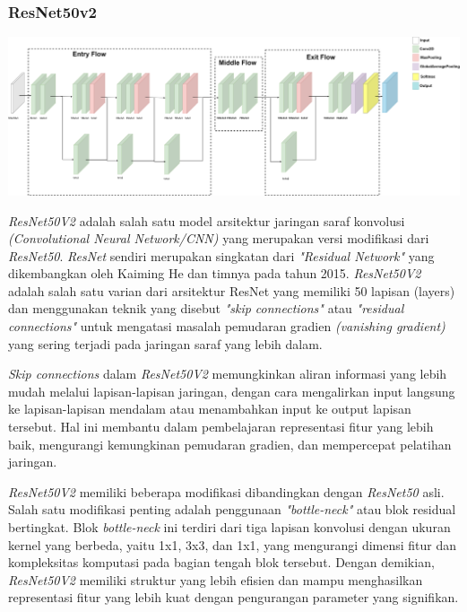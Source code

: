 \subsubsection{ResNet50v2}
\begin{center}
  \includegraphics[width=1.1\linewidth]{gambar/bener/Arsitektur_ModelCNNResNet50V2_Dasar.png}
  \label{fig:Arsitektur ResNet50V2}
\end{center}

\textit{ResNet50V2} adalah salah satu model arsitektur jaringan saraf konvolusi \textit{(Convolutional Neural Network/CNN)} yang merupakan versi modifikasi dari \textit{ResNet50}. \textit{ResNet} sendiri merupakan singkatan dari \textit{"Residual Network"} yang dikembangkan oleh Kaiming He dan timnya pada tahun 2015. \textit{ResNet50V2} adalah salah satu varian dari arsitektur ResNet yang memiliki 50 lapisan (layers) dan menggunakan teknik yang disebut \textit{"skip connections"} atau \textit{"residual connections"} untuk mengatasi masalah pemudaran gradien \textit{(vanishing gradient)} yang sering terjadi pada jaringan saraf yang lebih dalam. \cite{rahimzadeh2020modified}

\textit{Skip connections} dalam \textit{ResNet50V2} memungkinkan aliran informasi yang lebih mudah melalui lapisan-lapisan jaringan, dengan cara mengalirkan input langsung ke lapisan-lapisan mendalam atau menambahkan input ke output lapisan tersebut. Hal ini membantu dalam pembelajaran representasi fitur yang lebih baik, mengurangi kemungkinan pemudaran gradien, dan mempercepat pelatihan jaringan.

\textit{ResNet50V2} memiliki beberapa modifikasi dibandingkan dengan \textit{ResNet50} asli. Salah satu modifikasi penting adalah penggunaan \textit{"bottle-neck"} atau blok residual bertingkat. Blok \textit{bottle-neck} ini terdiri dari tiga lapisan konvolusi dengan ukuran kernel yang berbeda, yaitu 1x1, 3x3, dan 1x1, yang mengurangi dimensi fitur dan kompleksitas komputasi pada bagian tengah blok tersebut. Dengan demikian, \textit{ResNet50V2} memiliki struktur yang lebih efisien dan mampu menghasilkan representasi fitur yang lebih kuat dengan pengurangan parameter yang signifikan.

